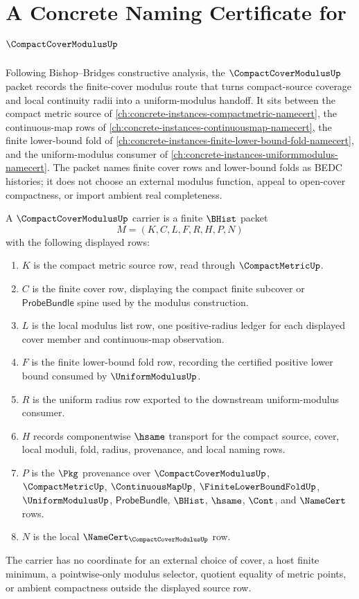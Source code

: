 \chapter{A Concrete Naming Certificate for $\CompactCoverModulusUp$}
\label{ch:concrete-instances-compact-cover-modulus-namecert}

Following Bishop--Bridges constructive analysis, the $\CompactCoverModulusUp$ packet records the finite-cover modulus route that turns compact-source coverage and local continuity radii into a uniform-modulus handoff. It sits between the compact metric source of \autoref{ch:concrete-instances-compactmetric-namecert}, the continuous-map rows of \autoref{ch:concrete-instances-continuousmap-namecert}, the finite lower-bound fold of \autoref{ch:concrete-instances-finite-lower-bound-fold-namecert}, and the uniform-modulus consumer of \autoref{ch:concrete-instances-uniformmodulus-namecert}. The packet names finite cover rows and lower-bound folds as BEDC histories; it does not choose an external modulus function, appeal to open-cover compactness, or import ambient real completeness.

\begin{definition}
\label{def:compact-cover-modulus-carrier}
A $\CompactCoverModulusUp$ carrier is a finite $\BHist$ packet
$$
M=(K,C,L,F,R,H,P,N)
$$
with the following displayed rows:
\begin{enumerate}
\item $K$ is the compact metric source row, read through $\CompactMetricUp$.
\item $C$ is the finite cover row, displaying the compact finite subcover or $\mathsf{ProbeBundle}$ spine used by the modulus construction.
\item $L$ is the local modulus list row, one positive-radius ledger for each displayed cover member and continuous-map observation.
\item $F$ is the finite lower-bound fold row, recording the certified positive lower bound consumed by $\UniformModulusUp$.
\item $R$ is the uniform radius row exported to the downstream uniform-modulus consumer.
\item $H$ records componentwise $\hsame$ transport for the compact source, cover, local moduli, fold, radius, provenance, and local naming rows.
\item $P$ is the $\Pkg$ provenance over $\CompactCoverModulusUp$, $\CompactMetricUp$, $\ContinuousMapUp$, $\FiniteLowerBoundFoldUp$, $\UniformModulusUp$, $\mathsf{ProbeBundle}$, $\BHist$, $\hsame$, $\Cont$, and $\NameCert$ rows.
\item $N$ is the local $\NameCert_{\CompactCoverModulusUp}$ row.
\end{enumerate}
The carrier has no coordinate for an external choice of cover, a host finite minimum, a pointwise-only modulus selector, quotient equality of metric points, or ambient compactness outside the displayed source row.
\end{definition}

